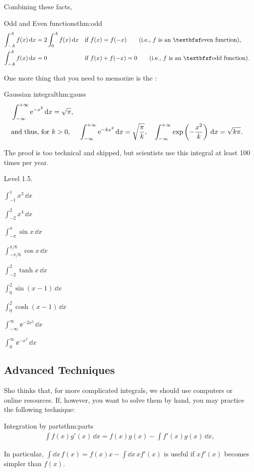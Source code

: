 \documentclass[11pt,pdfa,lastpage]{MishoNote}
\newcommand\intdx{\displaystyle\int\!\dd x\,}
\newcommand\INC[3]{\item$\displaystyle\int^{#2}_{#1}#3\,\dd x$}
\begin{document}
Combining these facts,
\begin{theorem}{Odd and Even functions}{thm:odd}\vspace{-1em}
  \begin{align}
    \int_{-A}^{A}f(x)\,\dd x&=2\int_{0}^{A}f(x)\,\dd x
    &&\text{if $f(x)=f(-x)$\qquad  (i.e., $f$ is an \Emph*{even function}),}\\
    \int_{-A}^{A}f(x)\,\dd x&=0
    &&\text{if $f(x)+f(-x)=0$\qquad  (i.e., $f$ is an \Emph*{odd function}).}
  \end{align}
\end{theorem}
\begin{quizzes}
\end{quizzes}

One more thing that you need to memorize is the :
\begin{theorem}{Gaussian integral}{thm:gauss}\vspace{-1em}
  \begin{align}
  &\int_{-\infty}^{+\infty}{\mathrm{e}}^{-x^2}\,{\mathrm{d}} x=\sqrt{\pi},\\\notag
    &\text{and thus, for $k>0$, }\quad\int_{-\infty}^{+\infty}{\mathrm{e}}^{-kx^2}\,{\mathrm{d}} x=\sqrt{\frac{\pi}{k}},\quad
    \int_{-\infty}^{+\infty}\exp\left(-\frac{x^2}{k}\right)\,{\mathrm{d}} x=\sqrt{k\pi}.
  \end{align}
\end{theorem}
The proof is too technical and skipped, but scientists use this integral at least 100 times per year.
\begin{problems}
  \Problem[A] Level 1.5.
  \begin{menumerate}{3}
\INC{-1}{1}{x^3}
\INC{-2}{2}{x^4}
\INC{-\pi}{\pi}{\sin x}
\INC{-\pi/6}{\pi/6}{\cos x}
\INC{-2}{2}{\tanh x}
\INC{0}{2}{\sin(x-1)}
\INC{0}{2}{\cosh(x-1)}
\INC{-\infty}{\infty}{\ee^{-2x^2}}
\INC{0}{\infty}{\ee^{-x^2}}
\end{menumerate}\end{problems}
\newpage
\subsection{Advanced Techniques}
Sho thinks that, for more complicated integrals, we should use computers or online resources. If, however, you want to solve them by hand, you may practice the following technique:
\begin{theorem}{Integration by parts}{thm:parts}\vspace{-.7em}
  \begin{align}
    &\int f(x)g'(x)\,\dd x=f(x)g(x)-\int f'(x)g(x)\,\dd x,
\end{align}
\end{theorem}
In particular, $\intdx f(x)=f(x)x-\intdx xf'(x)$ is useful if $xf'(x)$ becomes simpler than $f(x)$.
\end{document}
